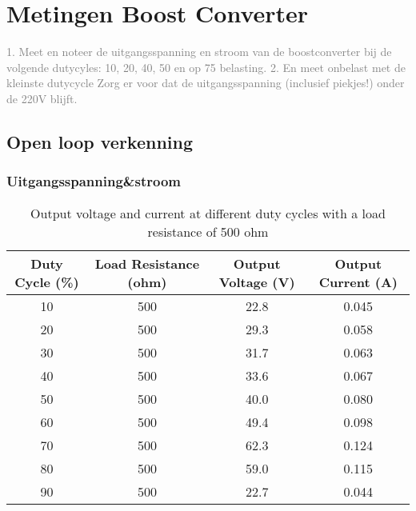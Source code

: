 \section{Metingen Boost Converter}
\textcolor{gray}{1. Meet en noteer de uitgangsspanning en stroom van de boostconverter bij de volgende
dutycyles: 10, 20, 40, 50 en op 75%
belasting. }\newline
\textcolor{gray}{2. En meet onbelast met de kleinste dutycycle Zorg er voor dat de uitgangsspanning
(inclusief piekjes!) onder de 220V blijft.}
\subsection{Open loop verkenning}
\subsubsection{Uitgangsspanning\&stroom}
\begin{table}[h!]
\centering
\begin{tabular}{|c|c|c|c|}
\hline
\textbf{Duty Cycle (\%)} & \textbf{Load Resistance (ohm)} & \textbf{Output Voltage (V)} & \textbf{Output Current (A)} \\ \hline
10 & 500 & 22.8 & 0.045 \\ \hline
20 & 500 & 29.3 & 0.058 \\ \hline
30 & 500 & 31.7 & 0.063 \\ \hline
40 & 500 & 33.6 & 0.067 \\ \hline
50 & 500 & 40.0 & 0.080 \\ \hline
60 & 500 & 49.4 & 0.098 \\ \hline
70 & 500 & 62.3 & 0.124 \\ \hline
80 & 500 & 59.0 & 0.115 \\ \hline
90 & 500 & 22.7 & 0.044 \\ \hline
\end{tabular}
\caption{Output voltage and current at different duty cycles with a load resistance of 500 ohm}
\label{tab:duty_cycle_output}
\end{table}

